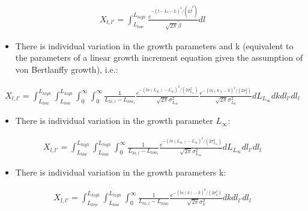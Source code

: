 \documentclass[]{article}
\providecommand{\tightlist}{%
  \setlength{\itemsep}{0pt}\setlength{\parskip}{0pt}}
\begin{document}
\begin{align}
 X_{l,l'} = \int_{L_{low}}^{L_{high}} \frac{e^{-(l-\bar{L}_{l}-I_{l})^{2}/(2\tilde{\beta}^{2})}}
                                          {\sqrt{2\pi}\tilde{\beta}} dl
 \end{align}

\begin{itemize}
\tightlist
\item
  There is individual variation in the growth parameters and k
  (equivalent to the parameters of a linear growth increment equation
  given the assumption of von Bertlanffy growth), i.e.:
\end{itemize}

\begin{align}
  X_{l,l'} = \int_{L_{low}}^{L_{high}} \! \int_{L_{low}}^{L_{high}} \! \int_{0}^{\infty} \! \int_{0}^{\infty}
            \frac{1}{L_{hi,l}-L_{low_{l}}}
            \frac{e^{-(ln(L_{\infty})-\bar{L_{\infty}})^{2}/(2\sigma^{2}_{L_{\infty}})}}
                                          {\sqrt{2\pi}\sigma^{2}_{L_{\infty}}}
            \frac{e^{-(ln(k)-\bar{k})^{2}/(2\sigma^{2}_{k})}}
                                          {\sqrt{2\pi}\sigma^{2}_{L_{k}}}  dL_{L_{\infty}} dk dl_{l'} dl_{l}
                                          
 \end{align}

\begin{itemize}
\tightlist
\item
  There is individual variation in the growth parameter \(L_{\infty}\):
\end{itemize}

\begin{align}
  X_{l,l'} = \int_{L_{low}}^{L_{high}} \! \int_{L_{low}}^{L_{high}} \! \int_{0}^{\infty} 
            \frac{1}{L_{hi,l}-L_{low_{l}}}
            \frac{e^{-(ln(L_{\infty})-\bar{L_{\infty}})^{2}/(2\sigma^{2}_{L_{\infty}})}}
                                          {\sqrt{2\pi}\sigma^{2}_{L_{\infty}}} dL_{L_{\infty}} dl_{l'} dl_{l}
                                          
 \end{align}

\begin{itemize}
\tightlist
\item
  There is individual variation in the growth parameters k:
\end{itemize}

\begin{align}
  X_{l,l'} = \int_{L_{low}}^{L_{high}} \! \int_{L_{low}}^{L_{high}} \! \int_{0}^{\infty} 
            \frac{1}{L_{hi,l}-L_{low_{l}}}
            \frac{e^{-(ln(k)-\bar{k})^{2}/(2\sigma^{2}_{k})}}
                                          {\sqrt{2\pi}\sigma^{2}_{k}} dk dl_{l'} dl_{l}
                                          
 \end{align}
\end{document}
